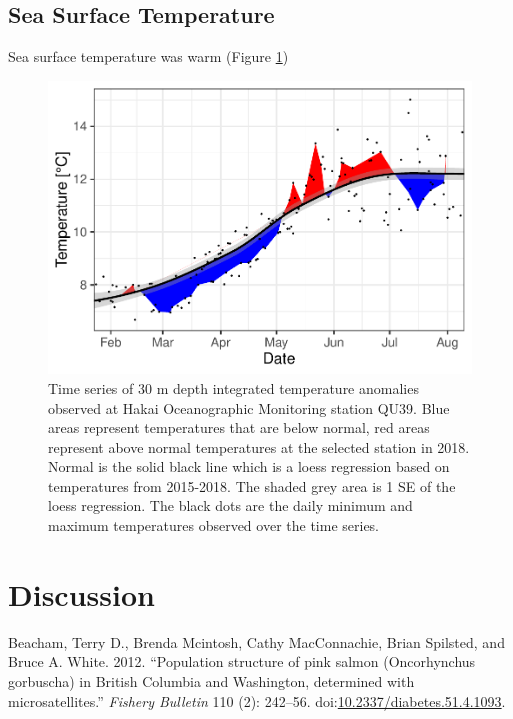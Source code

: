 \documentclass[fleqn,10pt]{wlpeerj} %
\begin{document}
\subsection*{Sea Surface Temperature}\label{sea-surface-temperature}

Sea surface temperature was warm (Figure \ref{fig:sst})

\begin{figure}
\includegraphics[width=0.8\linewidth]{peer_j_migration_dynamics_files/figure-latex/sst-1} \caption{Time series of 30 m depth integrated temperature anomalies observed at Hakai Oceanographic Monitoring station QU39. Blue areas represent temperatures that are below normal, red areas represent above normal temperatures at the selected station in 2018. Normal is the solid black line which is a loess regression based on temperatures from 2015-2018. The shaded grey area is 1 SE of the loess regression. The black dots are the daily minimum and maximum temperatures observed over the time series.}\label{fig:sst}
\end{figure}

\section*{Discussion}\label{discussion}

\hypertarget{refs}{}
\hypertarget{ref-Beacham2012}{}
Beacham, Terry D., Brenda Mcintosh, Cathy MacConnachie, Brian Spilsted,
and Bruce A. White. 2012. ``Population structure of pink salmon
(Oncorhynchus gorbuscha) in British Columbia and Washington, determined
with microsatellites.'' \emph{Fishery Bulletin} 110 (2): 242--56.
doi:\href{https://doi.org/10.2337/diabetes.51.4.1093}{10.2337/diabetes.51.4.1093}.
\end{document}
